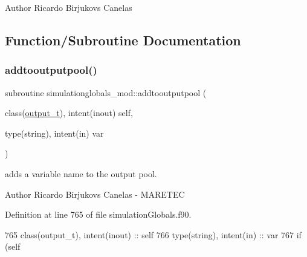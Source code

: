 \begin{DoxyAuthor}{Author}
Ricardo Birjukovs Canelas 
\end{DoxyAuthor}


\subsection{Function/\+Subroutine Documentation}
\mbox{\label{namespacesimulationglobals__mod_a1b94fa3858d556fc974a7ac6b18625cb}} 
\subsubsection{\texorpdfstring{addtooutputpool()}{addtooutputpool()}}
{\footnotesize\ttfamily subroutine simulationglobals\+\_\+mod\+::addtooutputpool (\begin{DoxyParamCaption}\item[{class(\mbox{\hyperlink{structsimulationglobals__mod_1_1output__t}{output\+\_\+t}}), intent(inout)}]{self,  }\item[{type(string), intent(in)}]{var }\end{DoxyParamCaption})\hspace{0.3cm}{\ttfamily [private]}}



adds a variable name to the output pool. 

\begin{DoxyAuthor}{Author}
Ricardo Birjukovs Canelas -\/ M\+A\+R\+E\+T\+EC 
\end{DoxyAuthor}


Definition at line 765 of file simulation\+Globals.\+f90.


\begin{DoxyCode}
765     \textcolor{keywordtype}{class}(output\_t), \textcolor{keywordtype}{intent(inout)} :: self
766     \textcolor{keywordtype}{type}(string), \textcolor{keywordtype}{intent(in)} :: var
767     \textcolor{keywordflow}{if} (self%
\end{DoxyCode}
\mbox{\label{namespacesimulationglobals__mod_afd372c5764a180f9029d4dc3cddce94d}} 
